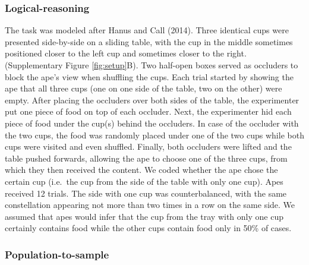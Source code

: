 \documentclass[
  man,floatsintext]{apa6}
\begin{document}
\hypertarget{logical-reasoning}{%
\subsubsection{Logical-reasoning}\label{logical-reasoning}}

The task was modeled after Hanus and Call (2014). Three identical cups were presented side-by-side on a sliding table, with the cup in the middle sometimes positioned closer to the left cup and sometimes closer to the right. (Supplementary Figure \ref{fig:setup}B). Two half-open boxes served as occluders to block the ape's view when shuffling the cups. Each trial started by showing the ape that all three cups (one on one side of the table, two on the other) were empty. After placing the occluders over both sides of the table, the experimenter put one piece of food on top of each occluder. Next, the experimenter hid each piece of food under the cup(s) behind the occluders. In case of the occluder with the two cups, the food was randomly placed under one of the two cups while both cups were visited and even shuffled. Finally, both occluders were lifted and the table pushed forwards, allowing the ape to choose one of the three cups, from which they then received the content. We coded whether the ape chose the certain cup (i.e.~the cup from the side of the table with only one cup). Apes received 12 trials. The side with one cup was counterbalanced, with the same constellation appearing not more than two times in a row on the same side. We assumed that apes would infer that the cup from the tray with only one cup certainly contains food while the other cups contain food only in 50\% of cases.

\hypertarget{population-to-sample}{%
\subsubsection{Population-to-sample}\label{population-to-sample}}
\end{document}
